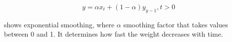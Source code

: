 \begin{equation}
  \label{eq:exponential_smoothing}
  y = \alpha x_t + (1 - \alpha)y_{y-1}, t > 0
\end{equation}

shows exponential smoothing, where $\alpha$ smoothing factor
that takes values between 0 and 1. It determines how fast the weight decreases with time.




